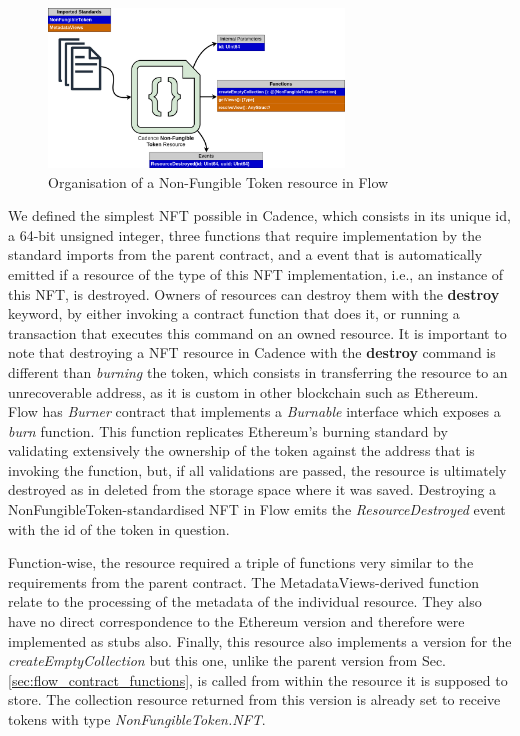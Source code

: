 \documentclass[../main.tex]{subfiles}
\begin{document}
\begin{figure}[htp]
    \centering
    \includegraphics[width=0.7\textwidth]{../Images/06_Cadence_NFT_Arch.png}
    \caption{Organisation of a Non-Fungible Token resource in Flow}
    \label{fig:cadence_nft_architecture}
\end{figure}

We defined the simplest NFT possible in Cadence, which consists in its unique id, a 64-bit unsigned integer, three functions that require implementation by the standard imports from the parent contract, and a event that is automatically emitted if a resource of the type of this NFT implementation, i.e., an instance of this NFT, is destroyed. Owners of resources can destroy them with the \textbf{destroy} keyword, by either invoking a contract function that does it, or running a transaction that executes this command on an owned resource. It is important to note that destroying a NFT resource in Cadence with the \textbf{destroy} command is different than \textit{burning} the token, which consists in transferring the resource to an unrecoverable address, as it is custom in other blockchain such as Ethereum. Flow has \textit{Burner} contract that implements a \textit{Burnable} interface which exposes a \textit{burn} function. This function replicates Ethereum's burning standard by validating extensively the ownership of the token against the address that is invoking the function, but, if all validations are passed, the resource is ultimately destroyed as in deleted from the storage space where it was saved. Destroying a NonFungibleToken-standardised NFT in Flow emits the \textit{ResourceDestroyed} event with the id of the token in question.
\par
Function-wise, the resource required a triple of functions very similar to the requirements from the parent contract. The MetadataViews-derived function relate to the processing of the metadata of the individual resource. They also have no direct correspondence to the Ethereum version and therefore were implemented as stubs also. Finally, this resource also implements a version for the \textit{createEmptyCollection} but this one, unlike the parent version from Sec. \ref{sec:flow_contract_functions}, is called from within the resource it is supposed to store. The collection resource returned from this version is already set to receive tokens with type \textit{NonFungibleToken.NFT}.
\end{document}
